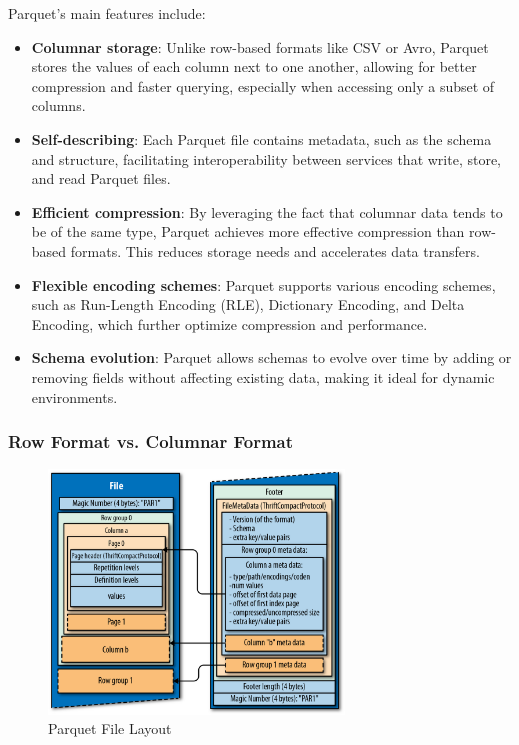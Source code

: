 Parquet's main features include:
\begin{itemize}
    \item \textbf{Columnar storage}: Unlike row-based formats like \ac{CSV} or Avro, Parquet stores the values of each column next to one another, allowing for better compression and faster querying, especially when accessing only a subset of columns.
    \item \textbf{Self-describing}: Each Parquet file contains metadata, such as the schema and structure, facilitating interoperability between services that write, store, and read Parquet files.
    \item \textbf{Efficient compression}: By leveraging the fact that columnar data tends to be of the same type, Parquet achieves more effective compression than row-based formats. This reduces storage needs and accelerates data transfers.
    \item \textbf{Flexible encoding schemes}: Parquet supports various encoding schemes, such as Run-Length Encoding (RLE), Dictionary Encoding, and Delta Encoding, which further optimize compression and performance.
    \item \textbf{Schema evolution}: Parquet allows schemas to evolve over time by adding or removing fields without affecting existing data, making it ideal for dynamic environments.
\end{itemize}

\subsubsection{Row Format vs. Columnar Format}

\begin{figure}[H]
    \centering
    \includegraphics[width=0.7\textwidth]{res/ParquetFileLayout.png}
    \caption{Parquet File Layout}
    \label{fig:parquetlayout}
\end{figure}

